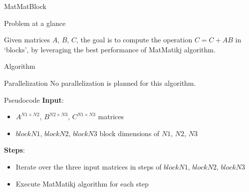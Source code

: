 \begin{chapter}{MatMatBlock}
    \begin{section}{Problem at a glance}
        \par Given matrices $A$, $B$, $C$, the goal is to compute the  operation $C = C + AB$ in `blocks', by leveraging the best performance of MatMatikj algorithm.
    \end{section}
    \begin{section}{Algorithm}
        \begin{subsection}{Parallelization}
            No parallelization is planned for this algorithm.
        \end{subsection}
        \begin{subsection}{Pseudocode}
            \textbf{Input}:
            \begin{itemize}
                \item $A^{N1 \times N2}$, $B^{N2 \times N3}$, $C^{N1 \times N3}$ matrices
                \item $blockN1$, $blockN2$, $blockN3$ block dimensions of $N1$, $N2$, $N3$
            \end{itemize}
            \textbf{Steps}:
            \begin{itemize}
                \item Iterate over the three input matrices in steps of $blockN1$, $blockN2$, $blockN3$
                \item Execute MatMatikj algorithm for each step
            \end{itemize}
            
        \end{subsection}
    \end{section}
\end{chapter}
